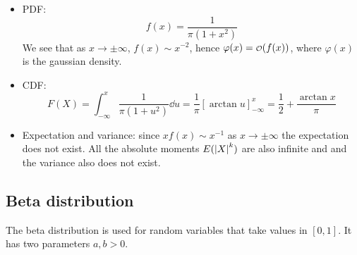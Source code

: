 \documentclass[14pt]{extarticle}
\begin{document}
\begin{itemize}
    \item PDF:
          \begin{equation}
              f(x) = \frac{1}{\pi (1 + x^2)}
          \end{equation}
          We see that as $x \to \pm \infty$, $f(x) \sim x^{-2}$, hence $\varphi(x) = \o(f(x))$, where $\varphi(x)$ is the gaussian density.
    \item CDF:
          \begin{equation}
              F(X) = \int_{-\infty}^{x} \frac{1}{\pi(1+u^2)} \dd{u} = \frac{1}{\pi} \left[\arctan u\right]_{-\infty}^x = \frac{1}{2} + \frac{\arctan x}{\pi}
          \end{equation}
    \item Expectation and variance: since $x f(x) \sim x^{-1}$ as $x \to \pm \infty$ the expectation does not exist. All the absolute moments $E(\abs{X}^k)$ are also infinite and and the variance also does not exist.
\end{itemize}

\subsection{Beta distribution}

The beta distribution is used for random variables that take values in $[0, 1]$.
It has two parameters $a, b \gt 0$.
\end{document}
